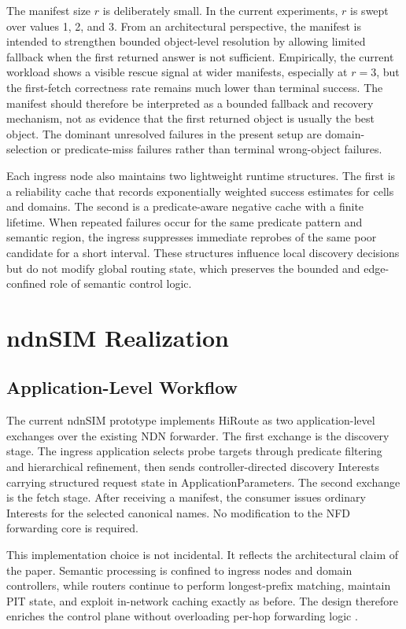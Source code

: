 \documentclass[journal]{IEEEtran}
\newcommand{\sysname}{HiRoute}
\newcommand{\ap}{ApplicationParameters}
\begin{document}
The manifest size $r$ is deliberately small. In the current experiments, $r$ is swept over values 1, 2, and 3. From an architectural perspective, the manifest is intended to strengthen bounded object-level resolution by allowing limited fallback when the first returned answer is not sufficient. Empirically, the current workload shows a visible rescue signal at wider manifests, especially at $r=3$, but the first-fetch correctness rate remains much lower than terminal success. The manifest should therefore be interpreted as a bounded fallback and recovery mechanism, not as evidence that the first returned object is usually the best object. The dominant unresolved failures in the present setup are domain-selection or predicate-miss failures rather than terminal wrong-object failures.

Each ingress node also maintains two lightweight runtime structures. The first is a reliability cache that records exponentially weighted success estimates for cells and domains. The second is a predicate-aware negative cache with a finite lifetime. When repeated failures occur for the same predicate pattern and semantic region, the ingress suppresses immediate reprobes of the same poor candidate for a short interval. These structures influence local discovery decisions but do not modify global routing state, which preserves the bounded and edge-confined role of semantic control logic.

\section{ndnSIM Realization}

\subsection{Application-Level Workflow}

The current ndnSIM prototype implements \sysname{} as two application-level exchanges over the existing NDN forwarder. The first exchange is the discovery stage. The ingress application selects probe targets through predicate filtering and hierarchical refinement, then sends controller-directed discovery Interests carrying structured request state in \ap{}. The second exchange is the fetch stage. After receiving a manifest, the consumer issues ordinary Interests for the selected canonical names. No modification to the NFD forwarding core is required.

This implementation choice is not incidental. It reflects the architectural claim of the paper. Semantic processing is confined to ingress nodes and domain controllers, while routers continue to perform longest-prefix matching, maintain PIT state, and exploit in-network caching exactly as before. The design therefore enriches the control plane without overloading per-hop forwarding logic \cite{nlsr,hrouting}.
\end{document}
